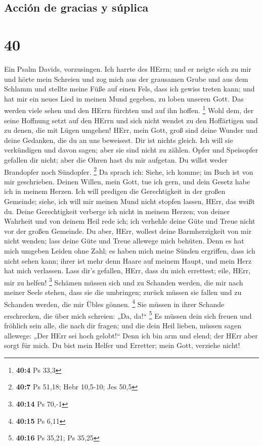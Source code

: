 \hypertarget{acciuxf3n-de-gracias-y-suxfaplica}{%
\subsection{Acción de gracias y
súplica}\label{acciuxf3n-de-gracias-y-suxfaplica}}

\hypertarget{section-39}{%
\section{40}\label{section-39}}

 Ein Psalm Davids, vorzusingen.  Ich harrte
des HErrn; und er neigte sich zu mir und hörte mein Schreien
 und zog mich aus der grausamen Grube und aus dem Schlamm
und stellte meine Füße auf einen Fels, dass ich gewiss treten kann;
 und hat mir ein neues Lied in meinen Mund gegeben, zu
loben unseren Gott. Das werden viele sehen und den HErrn fürchten und
auf ihn hoffen. \footnote{\textbf{40:4} Ps 33,3}  Wohl
dem, der seine Hoffnung setzt auf den HErrn und sich nicht wendet zu den
Hoffärtigen und zu denen, die mit Lügen umgehen!  HErr,
mein Gott, groß sind deine Wunder und deine Gedanken, die du an uns
beweisest. Dir ist nichts gleich. Ich will sie verkündigen und davon
sagen; aber sie sind nicht zu zählen.  Opfer und
Speisopfer gefallen dir nicht; aber die Ohren hast du mir aufgetan. Du
willst weder Brandopfer noch Sündopfer. \footnote{\textbf{40:7} Ps
  51,18; Hebr 10,5-10; Jes 50,5}  Da sprach ich: Siehe,
ich komme; im Buch ist von mir geschrieben.  Deinen
Willen, mein Gott, tue ich gern, und dein Gesetz habe ich in meinem
Herzen.  Ich will predigen die Gerechtigkeit in der
großen Gemeinde; siehe, ich will mir meinen Mund nicht stopfen lassen,
HErr, das weißt du.  Deine Gerechtigkeit verberge ich
nicht in meinem Herzen; von deiner Wahrheit und von deinem Heil rede
ich; ich verhehle deine Güte und Treue nicht vor der großen Gemeinde.
 Du aber, HErr, wollest deine Barmherzigkeit von mir
nicht wenden; lass deine Güte und Treue allewege mich behüten.
 Denn es hat mich umgeben Leiden ohne Zahl; es haben mich
meine Sünden ergriffen, dass ich nicht sehen kann; ihrer ist mehr denn
Haare auf meinem Haupt, und mein Herz hat mich verlassen.
 Lass dir's gefallen, HErr, dass du mich errettest; eile,
HErr, mir zu helfen! \footnote{\textbf{40:14} Ps 70,-1} 
Schämen müssen sich und zu Schanden werden, die mir nach meiner Seele
stehen, dass sie die umbringen; zurück müssen sie fallen und zu Schanden
werden, die mir Übles gönnen. \footnote{\textbf{40:15} Ps 6,11}
 Sie müssen in ihrer Schande erschrecken, die über mich
schreien: „Da, da!{}`` \footnote{\textbf{40:16} Ps 35,21; Ps 35,25}
 Es müssen dein sich freuen und fröhlich sein alle, die
nach dir fragen; und die dein Heil lieben, müssen sagen allewege: „Der
HErr sei hoch gelobt!{}``  Denn ich bin arm und elend;
der HErr aber sorgt für mich. Du bist mein Helfer und Erretter; mein
Gott, verziehe nicht!

